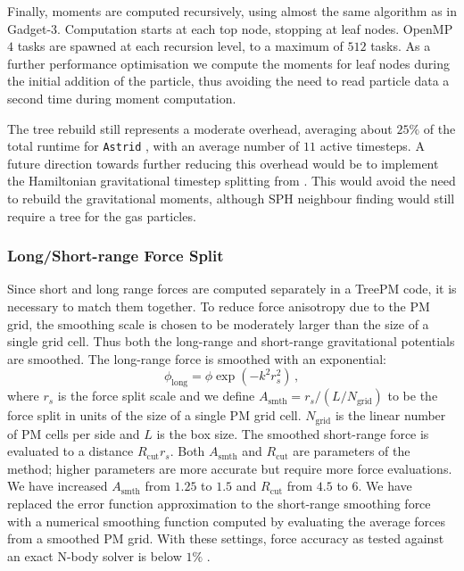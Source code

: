 \documentclass[fleqn,usenatbib]{mnras}
\def\astrid{\texttt{Astrid} }
\begin{document}
Finally, moments are computed recursively, using almost the same algorithm as in Gadget-3. Computation starts at each top node, stopping at leaf nodes. OpenMP $4$ tasks are spawned at each recursion level, to a maximum of $512$ tasks. As a further performance optimisation we compute the moments for leaf nodes during the initial addition of the particle, thus avoiding the need to read particle data a second time during moment computation.

The tree rebuild still represents a moderate overhead, averaging about $25\%$ of the total runtime for \astrid, with an average number of $11$ active timesteps. A future direction towards further reducing this overhead would be to implement the Hamiltonian gravitational timestep splitting from \cite{2020arXiv201003567S}. This would avoid the need to rebuild the gravitational moments, although SPH neighbour finding would still require a tree for the gas particles.

\subsubsection{Long/Short-range Force Split}

Since short and long range forces are computed separately in a TreePM code, it is necessary to match them together. To reduce force anisotropy due to the PM grid, the smoothing scale is chosen to be moderately larger than the size of a single grid cell. Thus both the long-range and short-range gravitational potentials are smoothed. The long-range force is smoothed with an exponential:
\begin{equation}
    \phi_\mathrm{long} = \phi \exp\left( -k^2 r_s^2\right)\,,
\end{equation}
where $r_s$ is the force split scale and we define $A_\mathrm{smth} = r_s / (L / N_\mathrm{grid})$ to be the force split in units of the size of a single PM grid cell. $N_\mathrm{grid}$ is the linear number of PM cells per side and $L$ is the box size. The smoothed short-range force is evaluated to a distance $R_{\mathrm{cut}} r_s$. Both $A_\mathrm{smth}$ and $R_{\mathrm{cut}}$ are parameters of the method; higher parameters are more accurate but require more force evaluations. We have increased $A_\mathrm{smth}$ from $1.25$ to $1.5$ and $R_{\mathrm{cut}}$ from $4.5$ to $6$. We have replaced the error function approximation to the short-range smoothing force with a numerical smoothing function computed by evaluating the average forces from a smoothed PM grid. With these settings, force accuracy as tested against an exact N-body solver is below $1\%$ \citep{2020arXiv201003567S}.
\end{document}
